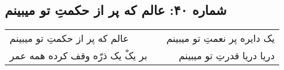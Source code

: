\begin{center}
\section*{شماره ۴۰: عالم که پر از حکمتِ تو میبینم}
\label{sec:040}
\begin{longtable}{l p{0.5cm} r}
عالم که پر از حکمتِ تو میبینم
&&
یک دایره پر نعمتِ تو میبینم
\\
بر یکْ یک ذرّه وقف کرده همه عمر
&&
دریا دریا قدرتِ تو میبینم
\\
\end{longtable}
\end{center}
